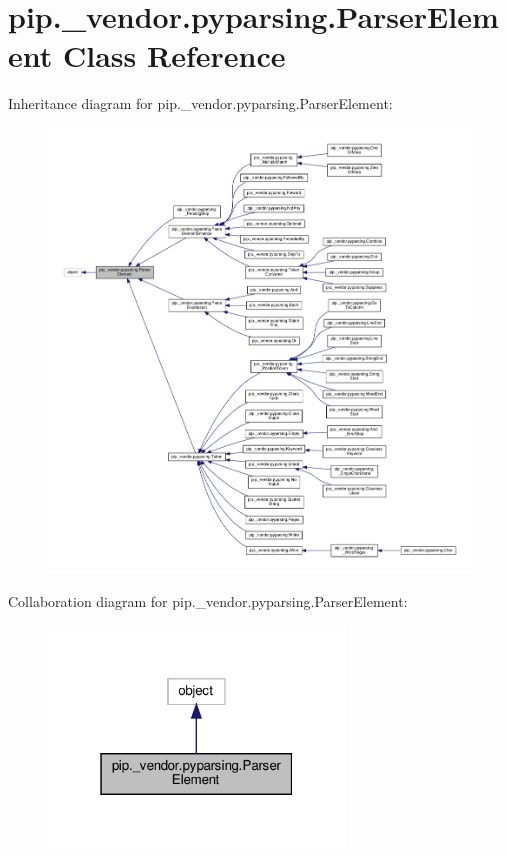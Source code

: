 \hypertarget{classpip_1_1__vendor_1_1pyparsing_1_1ParserElement}{}\section{pip.\+\_\+vendor.\+pyparsing.\+Parser\+Element Class Reference}
\label{classpip_1_1__vendor_1_1pyparsing_1_1ParserElement}


Inheritance diagram for pip.\+\_\+vendor.\+pyparsing.\+Parser\+Element\+:
\nopagebreak
\begin{figure}[H]
\begin{center}
\leavevmode
\includegraphics[width=350pt]{classpip_1_1__vendor_1_1pyparsing_1_1ParserElement__inherit__graph}
\end{center}
\end{figure}


Collaboration diagram for pip.\+\_\+vendor.\+pyparsing.\+Parser\+Element\+:
\nopagebreak
\begin{figure}[H]
\begin{center}
\leavevmode
\includegraphics[width=223pt]{classpip_1_1__vendor_1_1pyparsing_1_1ParserElement__coll__graph}
\end{center}
\end{figure}
